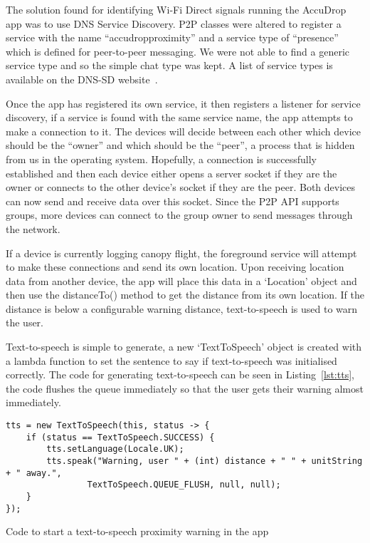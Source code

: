 The solution found for identifying Wi-Fi Direct signals running the AccuDrop app was to use DNS Service Discovery. P2P classes were altered to register a service with the name ``accudropproximity'' and a service type of ``presence'' which is defined for peer-to-peer messaging. We were not able to find a generic service type and so the simple chat type was kept. A list of service types is available on the DNS-SD website~\cite{_dns_????}.

Once the app has registered its own service, it then registers a listener for service discovery, if a service is found with the same service name, the app attempts to make a connection to it. The devices will decide between each other which device should be the ``owner'' and which should be the ``peer'', a process that is hidden from us in the operating system. Hopefully, a connection is successfully established and then each device either opens a server socket if they are the owner or connects to the other device's socket if they are the peer. Both devices can now send and receive data over this socket. Since the P2P API supports groups, more devices can connect to the group owner to send messages through the network.

If a device is currently logging canopy flight, the foreground service will attempt to make these connections and send its own location. Upon receiving location data from another device, the app will place this data in a `Location' object and then use the distanceTo() method to get the distance from its own location. If the distance is below a configurable warning distance, text-to-speech is used to warn the user.

Text-to-speech is simple to generate, a new `TextToSpeech' object is created with a lambda function to set the sentence to say if text-to-speech was initialised correctly. The code for generating text-to-speech can be seen in Listing~\vref{lst:tts}, the code flushes the queue immediately so that the user gets their warning almost immediately.

\begin{listing*}
  \centering
  \begin{verbatim}
tts = new TextToSpeech(this, status -> {
    if (status == TextToSpeech.SUCCESS) {
        tts.setLanguage(Locale.UK);
        tts.speak("Warning, user " + (int) distance + " " + unitString + " away.",
                TextToSpeech.QUEUE_FLUSH, null, null);
    }
});
  \end{verbatim}
  \caption{Code to start a text-to-speech proximity warning in the app}\label{lst:tts}
\end{listing*}

